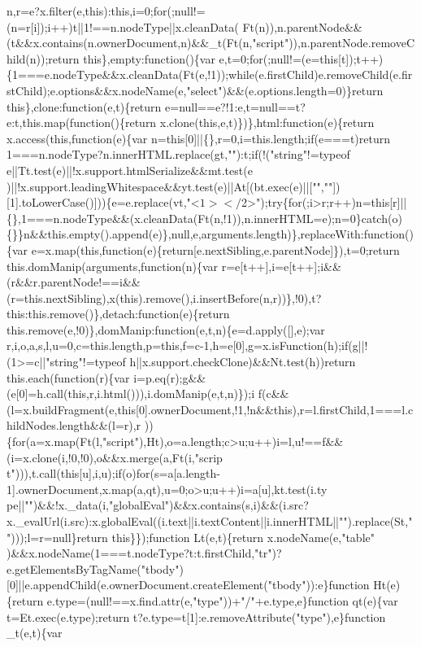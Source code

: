 \begin{DoxyCode}
{       n,r=e?x.filter(e,this):this,i=0;for(;null!=(n=r[i]);i++)t||1!==n.nodeType||x.cleanData(
      Ft(n)),n.parentNode&&(t&&x.contains(n.ownerDocument,n)&&\_t(Ft(n,"script")),n.parentNode.removeChild(n));return this\},empty:function()\{var
       e,t=0;for(;null!=(e=this[t]);t++)\{1===e.nodeType&&x.cleanData(Ft(e,!1));while(e.firstChild)e.removeChild(e.firstChild);e.options&&x.nodeName(e,"select")&&(e.options.length=0)\}return
       this\},clone:function(e,t)\{return e=null==e?!1:e,t=null==t?e:t,this.map(function()\{return
       x.clone(this,e,t)\})\},html:function(e)\{return x.access(this,function(e)\{var n=this[0]||\{\},r=0,i=this.length;if(e===t)return
       1===n.nodeType?n.innerHTML.replace(gt,""):t;if(!("string"!=typeof
       e||Tt.test(e)||!x.support.htmlSerialize&&mt.test(e
      )||!x.support.leadingWhitespace&&yt.test(e)||At[(bt.exec(e)||["",""])[1].toLowerCase()]))\{e=e.replace(vt,"<$
      1></$2>");try\{for(;i>r;r++)n=this[r]||\{\},1===n.nodeType&&(x.cleanData(Ft(n,!1)),n.innerHTML=e);n=0\}catch(o)\{\}\}n&&this.empty().append(e)\},null,e,arguments.length)\},replaceWith:function()\{var
       e=x.map(this,function(e)\{return[e.nextSibling,e.parentNode]\}),t=0;return this.domManip(arguments,function(n)\{var
       r=e[t++],i=e[t++];i&&
      (r&&r.parentNode!==i&&(r=this.nextSibling),x(this).remove(),i.insertBefore(n,r))\},!0),t?this:this.remove()\},detach:function(e)\{return this.remove(e,!0)\},domManip:function(e,t,n)\{e=d.apply([],e);var
       r,i,o,a,s,l,u=0,c=this.length,p=this,f=c-1,h=e[0],g=x.isFunction(h);if(g||!(1>=c||"string"!=typeof
       h||x.support.checkClone)&&Nt.test(h))return this.each(function(r)\{var
       i=p.eq(r);g&&(e[0]=h.call(this,r,i.html())),i.domManip(e,t,n)\});i
      f(c&&(l=x.buildFragment(e,this[0].ownerDocument,!1,!n&&this),r=l.firstChild,1===l.childNodes.length&&(l=r),r
      ))\{for(a=x.map(Ft(l,"script"),Ht),o=a.length;c>u;u++)i=l,u!==f&&(i=x.clone(i,!0,!0),o&&x.merge(a,Ft(i,"scrip
      t"))),t.call(this[u],i,u);if(o)for(s=a[a.length-1].ownerDocument,x.map(a,qt),u=0;o>u;u++)i=a[u],kt.test(i.ty
      pe||"")&&!x.\_data(i,"globalEval")&&x.contains(s,i)&&(i.src?x.\_evalUrl(i.src):x.globalEval((i.text||i.textContent||i.innerHTML||"").replace(St,"")));l=r=null\}return this\}\});function Lt(e,t)\{return
       x.nodeName(e,"table"
      )&&x.nodeName(1===t.nodeType?t:t.firstChild,"tr")?e.getElementsByTagName("tbody")[0]||e.appendChild(e.ownerDocument.createElement("tbody")):e\}function Ht(e)\{return
       e.type=(null!==x.find.attr(e,"type"))+"/"+e.type,e\}function qt(e)\{var t=Et.exec(e.type);return t?e.type=t[1]:e.removeAttribute("type"),e\}function \_t(e,t)\{var
}
\end{DoxyCode}
